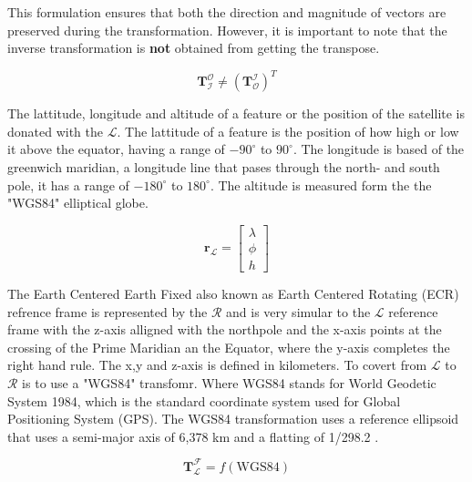 \noindent This formulation ensures that both the direction and magnitude of vectors are preserved during the transformation. However, it is important to note 
that the inverse transformation is \textbf{not} obtained from getting the transpose.

\begin{equation}
    \mathbf{T}_\mathcal{I}^\mathcal{O} \ne \left(\mathbf{T}_\mathcal{O}^\mathcal{I}\right)^T
\end{equation}


The lattitude, longitude and altitude of a feature or the position of the satellite is donated with the $\mathcal{L}$. The lattitude of a feature is the position of how high or low it above the
equator, having a range of $-90^{\circ}$ to $90^{\circ}$. The longitude is based of the greenwich maridian, a longitude line that pases through the north- and south pole, it has a
range of $-180^{\circ}$ to $180^{\circ}$. The altitude is measured form the the "WGS84" elliptical globe.

\begin{equation}
    \mathbf{r}_\mathcal{L} = \begin{bmatrix}
    \lambda \\
    \phi \\
    h    
    \end{bmatrix} 
\end{equation}


The Earth Centered Earth Fixed also known as Earth Centered Rotating (ECR) refrence frame is represented by the $\mathcal{R}$ and is very simular to the $\mathcal{L}$ reference
 frame with the z-axis alligned with the northpole and the x-axis points at the crossing of the Prime Maridian an the Equator, where the y-axis completes the right hand rule. The x,y and z-axis is defined in kilometers.
To covert from $\mathcal{L}$ to $\mathcal{R}$ is to use a "WGS84" transfomr. Where WGS84 stands for World Geodetic System 1984, which is the standard coordinate system used for
Global Positioning System (GPS). The WGS84 transformation uses a reference ellipsoid that uses a semi-major axis of 6,378 km and a flatting of 1/298.2 .

\begin{equation}
        \mathbf{T}_{\mathcal{L}}^{\mathcal{F}} = f(\text{WGS84})
\end{equation}

